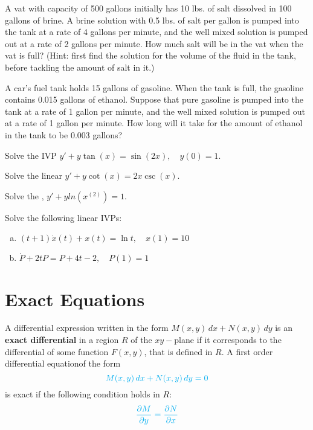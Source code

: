 \begin{question}
A vat with capacity of 500 gallons initially has 10 lbs. of salt dissolved in 100 gallons of brine. A
brine solution with 0.5 lbs. of salt per gallon is pumped into the tank at a rate of 4 gallons per
minute, and the well mixed solution is pumped out at a rate of 2 gallons per minute. How much
salt will be in the vat when the vat is full? (Hint: first find the solution for the volume of the fluid in the tank, before tackling the amount of salt in it.)
\solspace{0.5in}
\end{question}

\begin{question}
A car's fuel tank holds 15 gallons of gasoline. When the tank is full, the gasoline contains 0.015 gallons of ethanol. 
Suppose that pure gasoline is pumped into the tank at a rate of 1 gallon per minute, and the well mixed solution is 
pumped out at a rate of 1 gallon per minute. How long will it take for the amount of ethanol in the tank to be 0.003 gallons?
\solspace{0.5in}
\end{question}

\begin{question}
  Solve the IVP \(y' + y \tan(x) = \sin(2x), \quad y(0)=1.\)
\solspace{0.5in}
\end{question}

\begin{question}
  Solve the linear \ode{} \(y' + y \cot(x) = 2x \csc(x)\).
\solspace{0.5in}
\end{question}

\begin{question}
  Solve the \ode{},  \(y'+yln (x^(2))=1\).
\solspace{0.5in}
\end{question}

\begin{question}
Solve the following linear IVPs:
  \begin{enumerate}[(a)]
    \item    \((t+1)\dot x(t) + x(t) = \ln t,\quad x(1)=10\)
    \item    \( \dot P + 2tP = P + 4t - 2,\quad P(1)=1\)
  \end{enumerate}
\end{question}







\section{Exact Equations}
\begin{definition}
  A differential expression written in the form $M(x,y)\,dx + N(x,y)\,dy$ is an \textbf{exact differential} in a region $R$
  of the $xy-$plane if it corresponds to the differential of some function $F(x,y)$, that is defined
  in $R$. A first order differential equationof the form 
  \[\textcolor{cyan}{M(x,y)\,dx + N(x,y)\,dy = 0}\] 
  is exact if the following condition holds in $R$:
$$ \textcolor{cyan}{\frac{\partial M}{\partial y} = \frac{\partial N}{\partial x}} $$
\end{definition}


